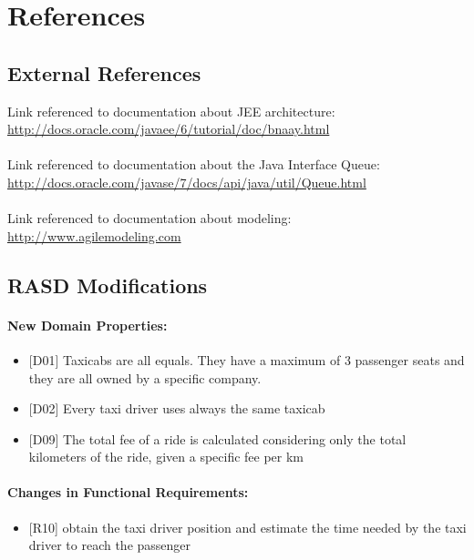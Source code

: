 \chapter{References} \label{chap6}
\section{External References}
Link referenced to documentation about JEE architecture:\\
\href{http://docs.oracle.com/javaee/6/tutorial/doc/bnaay.html} {http://docs.oracle.com/javaee/6/tutorial/doc/bnaay.html} \\ \\
Link referenced to documentation about the Java Interface Queue:\\
\href{http://docs.oracle.com/javase/7/docs/api/java/util/Queue.html} {http://docs.oracle.com/javase/7/docs/api/java/util/Queue.html} \\ \\
Link referenced to documentation about modeling:\\
\href{http://www.agilemodeling.com} {http://www.agilemodeling.com}

\section{RASD Modifications}
\subsubsection{New Domain Properties:}
\begin{itemize}
	\item {[D01]} Taxicabs are all equals. They have a maximum of 3 passenger seats and they are all owned by a specific company.
	\item {[D02]} Every taxi driver uses always the same taxicab
	\item {[D09]} The total fee of a ride is calculated considering only the total kilometers of the ride, given a specific fee per km
\end{itemize}

\subsubsection{Changes in Functional Requirements:}
\begin{itemize}
	\item {[R10]} obtain the taxi driver position and estimate the time needed by the taxi driver to reach the passenger
\end{itemize}

